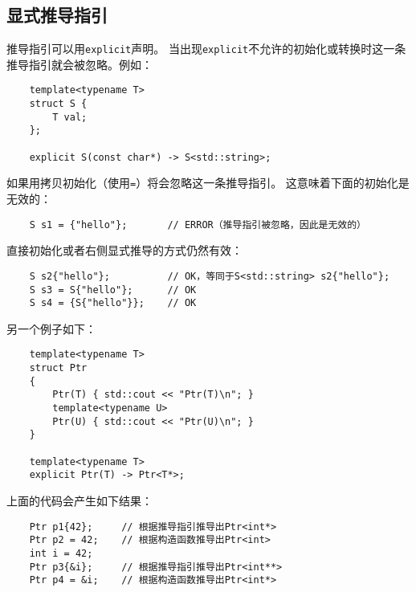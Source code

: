 \subsection{显式推导指引}
推导指引可以用\texttt{explicit}声明。
当出现\texttt{explicit}不允许的初始化或转换时这一条推导指引就会被忽略。例如：
\begin{lstlisting}
    template<typename T>
    struct S {
        T val;
    };

    explicit S(const char*) -> S<std::string>;
\end{lstlisting}
如果用拷贝初始化（使用\texttt{=}）将会忽略这一条推导指引。
这意味着下面的初始化是无效的：
\begin{lstlisting}
    S s1 = {"hello"};       // ERROR（推导指引被忽略，因此是无效的）
\end{lstlisting}
直接初始化或者右侧显式推导的方式仍然有效：
\begin{lstlisting}
    S s2{"hello"};          // OK，等同于S<std::string> s2{"hello"};
    S s3 = S{"hello"};      // OK
    S s4 = {S{"hello"}};    // OK
\end{lstlisting}
另一个例子如下：
\begin{lstlisting}
    template<typename T>
    struct Ptr
    {
        Ptr(T) { std::cout << "Ptr(T)\n"; }
        template<typename U>
        Ptr(U) { std::cout << "Ptr(U)\n"; }
    }

    template<typename T>
    explicit Ptr(T) -> Ptr<T*>;
\end{lstlisting}
上面的代码会产生如下结果：
\begin{lstlisting}
    Ptr p1{42};     // 根据推导指引推导出Ptr<int*>
    Ptr p2 = 42;    // 根据构造函数推导出Ptr<int>
    int i = 42;
    Ptr p3{&i};     // 根据推导指引推导出Ptr<int**>
    Ptr p4 = &i;    // 根据构造函数推导出Ptr<int*>
\end{lstlisting}

